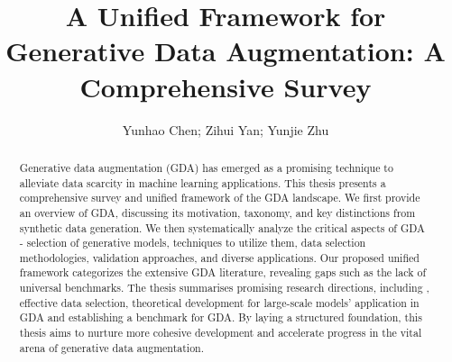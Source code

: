\documentclass[preprint,12pt,authoryear]{elsarticle}
\begin{document}
\begin{frontmatter}



\title{A Unified Framework for Generative Data Augmentation: A Comprehensive Survey}


\author{Yunhao Chen; Zihui Yan;  Yunjie Zhu}


\begin{abstract}
Generative data augmentation (GDA) has emerged as a promising technique to alleviate data scarcity in machine learning applications. This thesis presents a comprehensive survey and unified framework of the GDA landscape. We first provide an overview of GDA, discussing its motivation, taxonomy, and key distinctions from synthetic data generation. We then systematically analyze the critical aspects of GDA - selection of generative models, techniques to utilize them, data selection methodologies, validation approaches, and diverse applications. Our proposed unified framework categorizes the extensive GDA literature, revealing gaps such as the lack of universal benchmarks.  The thesis summarises promising research directions, including , effective data selection, theoretical development for large-scale models' application in GDA and establishing a benchmark for GDA. By laying a structured foundation, this thesis aims to nurture more cohesive development and accelerate progress in the vital arena of generative data augmentation.
\end{abstract}


\end{frontmatter}
\end{document}
